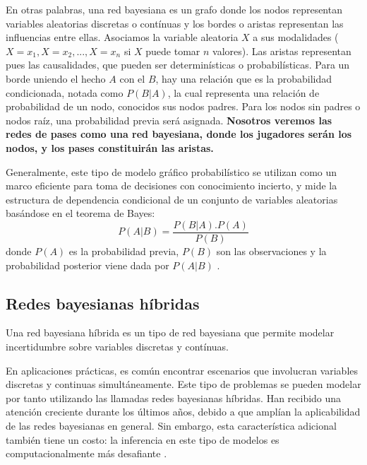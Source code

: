 En otras palabras, una red bayesiana es un grafo donde los nodos representan variables aleatorias discretas 
o contínuas y los bordes o aristas representan las influencias entre ellas. Asociamos la variable 
aleatoria $X$ a sus modalidades ($X=x_1, X=x_2,..., X=x_n$ si $X$ puede tomar $n$ valores). Las aristas 
representan pues las causalidades, que pueden ser determinísticas o probabilísticas. Para un borde 
uniendo el hecho $A$ con el $B$, hay una relación que es la probabilidad condicionada, notada como $P(B|A)$, 
la cual representa una relación de probabilidad de un nodo, conocidos sus nodos padres. Para los nodos 
sin padres o nodos raíz, una probabilidad previa será asignada. \textbf{Nosotros veremos las redes de pases como una 
red bayesiana, donde los jugadores serán los nodos, y los pases constituirán las aristas.}

Generalmente, este tipo de modelo gráfico probabilístico se utilizan como un marco eficiente para
toma de decisiones con conocimiento incierto, y mide la estructura de dependencia condicional
de un conjunto de variables aleatorias basándose en el teorema de Bayes:\\
\begin{equation} \label{eq:bayes}
P(A|B) = \frac{P(B|A).P(A)}{P(B)}
\end{equation}
donde $P(A)$ es la probabilidad previa, $P(B)$ son las observaciones y la probabilidad posterior viene dada 
por $P(A|B)$ \cite{YANG201919}.

\subsection{Redes bayesianas híbridas}
\begin{definicion} \label{def:hybrid_BN}
    Una red bayesiana híbrida \cite{hybrid-BN} es un tipo de red bayesiana que permite modelar incertidumbre
    sobre variables discretas y contínuas.
\end{definicion}

En aplicaciones prácticas, es común encontrar escenarios que
involucran variables discretas y continuas simultáneamente. Este tipo de problemas se pueden modelar por tanto
utilizando las llamadas redes bayesianas híbridas. Han recibido una atención creciente durante 
los últimos años, debido a que amplían la aplicabilidad de las redes bayesianas en general. Sin embargo, 
esta característica adicional también tiene un costo: la inferencia
en este tipo de modelos es computacionalmente más desafiante \cite{inference-rev-hbn}.

